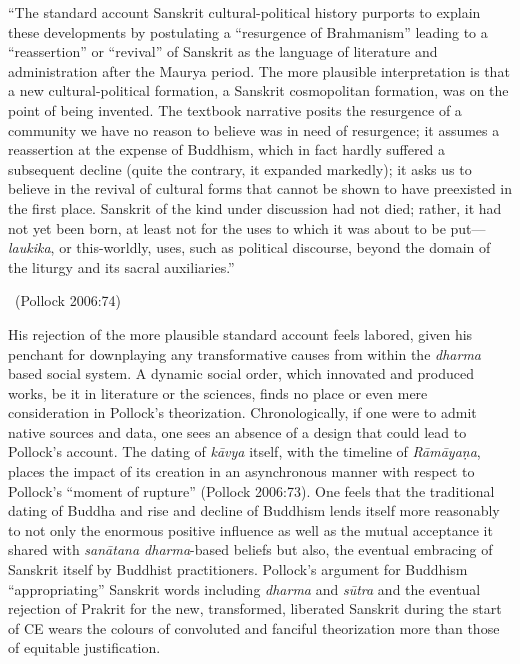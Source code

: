 \begin{myquote}
“The standard account Sanskrit cultural-political history purports to explain these developments by postulating a “resurgence of Brahmanism” leading to a “reassertion” or “revival” of Sanskrit as the language of literature and administration after the Maurya period. The more plausible interpretation is that a new cultural-political formation, a Sanskrit cosmopolitan formation, was on the point of being invented. The textbook narrative posits the resurgence of a community we have no reason to believe was in need of resurgence; it assumes a reassertion at the expense of Buddhism, which in fact hardly suffered a subsequent decline (quite the contrary, it expanded markedly); it asks us to believe in the revival of cultural forms that cannot be shown to have preexisted in the first place. Sanskrit of the kind under discussion had not died; rather, it had not yet been born, at least not for the uses to which it was about to be put—\textit{laukika}, or this-worldly, uses, such as political discourse, beyond the domain of the liturgy and its sacral auxiliaries.” 

~\hfill (Pollock 2006:74)
\end{myquote}

His rejection of the more plausible standard account feels labored, given his penchant for downplaying any transformative causes from within the \textit{dharma} based social system. A dynamic social order, which innovated and produced works, be it in literature or the sciences, finds no place or even mere consideration in Pollock’s theorization. Chronologically, if one were to admit native sources and data, one sees an absence of a design that could lead to Pollock’s account. The dating of \textit{kāvya} itself, with the timeline of \textit{Rāmāyaṇa}, places the impact of its creation in an asynchronous manner with respect to Pollock’s “moment of rupture” (Pollock 2006:73). One feels that the traditional dating of Buddha and rise and decline of Buddhism lends itself more reasonably to not only the enormous positive influence as well as the mutual acceptance it shared with \textit{sanātana dharma}-based beliefs but also, the eventual embracing of Sanskrit itself by Buddhist practitioners. Pollock’s argument for Buddhism “appropriating” Sanskrit words including \textit{dharma} and \textit{sūtra} and the eventual rejection of Prakrit for the new, transformed, liberated Sanskrit during the start of CE wears the colours of convoluted and fanciful theorization more than those of equitable justification.

